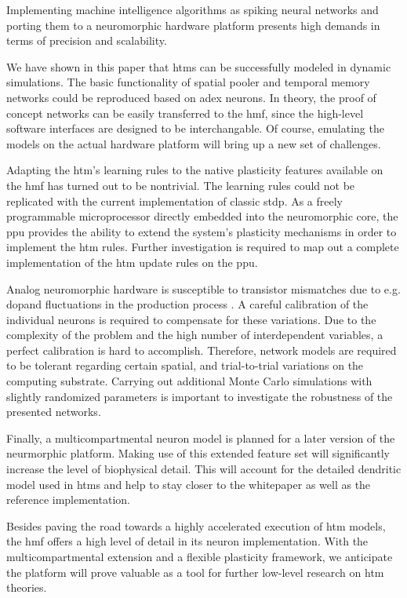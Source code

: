 Implementing machine intelligence algorithms as spiking neural networks and
porting them to a neuromorphic hardware platform presents high demands in terms
of precision and scalability.

We have shown in this paper that \glspl{htm} can be successfully modeled in
dynamic simulations. The basic functionality of spatial pooler and temporal
memory networks could be reproduced based on \gls{adex} neurons. In theory, the
proof of concept networks can be easily transferred to the \gls{hmf}, since the
high-level software interfaces are designed to be interchangable. Of course,
emulating the models on the actual hardware platform will bring up a new set of
challenges.

Adapting the \gls{htm}'s learning rules to the native plasticity features
available on the \gls{hmf} has turned out to be nontrivial. The learning rules
could not be replicated with the current implementation of classic \gls{stdp}.
As a freely programmable microprocessor directly embedded into the neuromorphic
core, the \gls{ppu} provides the ability to extend the system's plasticity
mechanisms in order to implement the \gls{htm} rules. Further investigation is
required to map out a complete implementation of the \gls{htm} update rules on
the \gls{ppu}.

Analog neuromorphic hardware is susceptible to transistor mismatches due to e.g. dopand fluctuations in the production process \citep{petrovici2014characterization}. A careful calibration of the individual neurons is required to compensate for these variations. Due to the complexity of the problem and the high number of interdependent variables, a perfect calibration is hard to accomplish. Therefore, network models are required to be tolerant regarding certain spatial, and trial-to-trial variations on the computing substrate. Carrying out additional Monte Carlo simulations with slightly randomized parameters is important to investigate the robustness of the presented networks.

Finally, a multicompartmental neuron model is planned for a later version of the neurmorphic platform. Making use of this extended feature set will significantly increase the level of biophysical detail. This will account for the detailed dendritic model used in \glspl{htm} and help to stay closer to the whitepaper as well as the reference implementation.

Besides paving the road towards a highly accelerated execution of \gls{htm}
models, the \gls{hmf} offers a high level of detail in its neuron
implementation. With the multicompartmental extension and a flexible plasticity
framework, we anticipate the platform will prove valuable as a tool for
further low-level research on \gls{htm} theories.
